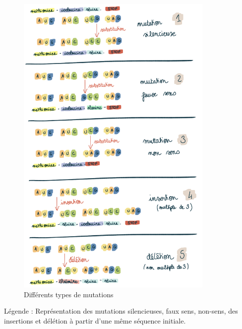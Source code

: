 \begin{figure}[H]
    \centering
    \includegraphics[width=0.85\textwidth]{figures/corps/figure2.png}
    \caption{Différents types de mutations}
    \label{fig:2_mutations}
\end{figure}
Légende : Représentation des mutations silencieuses, faux sens, non-sens, des insertions et délétion à partir d’une même séquence initiale. \newpage

